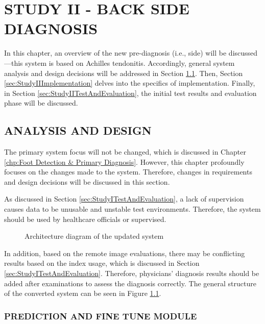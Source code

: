\chapter{STUDY II - BACK SIDE DIAGNOSIS}\label{chp:Back Side Diagnosis}

In this chapter, an overview of the new pre-diagnosis (i.e., side) will be discussed—this system is based on Achilles tendonitis. Accordingly, general system analysis and design decisions will be addressed in Section \ref{sec:StudyIIAnalysisAndDesign}. Then, Section \ref{sec:StudyIIImplementation} delves into the specifics of implementation. Finally, in Section \ref{sec:StudyIITestAndEvaluation}, the initial test results and evaluation phase will be discussed.

\section{ANALYSIS AND DESIGN} \label{sec:StudyIIAnalysisAndDesign}

The primary system focus will not be changed, which is discussed in Chapter \ref{chp:Foot Detection & Primary Diagnosis}. However, this chapter profoundly focuses on the changes made to the system. Therefore, changes in requirements and design decisions will be discussed in this section.

As discussed in Section \ref{sec:StudyITestAndEvaluation}, a lack of supervision causes data to be unusable and unstable test environments. Therefore, the system should be used by healthcare officials or supervised.

\begin{figure}[htbp]
\centering
{}
\caption{Architecture diagram of the updated system}
\label{fig:GeneralArchitectureDiagramPartI}
\end{figure}

In addition, based on the remote image evaluations, there may be conflicting results based on the index usage, which is discussed in Section \ref{sec:StudyITestAndEvaluation}. Therefore, physicians' diagnosis results should be added after examinations to assess the diagnosis correctly. The general structure of the converted system can be seen in Figure \ref{fig:GeneralArchitectureDiagramPartI}. 

\subsection{ PREDICTION AND FINE TUNE MODULE }

